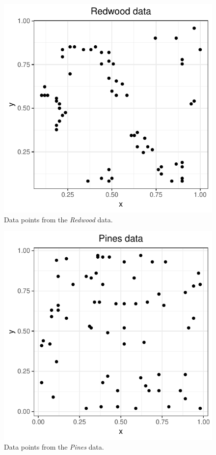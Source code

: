 \begin{figure}
    \centering
    \includegraphics[scale=0.9]{figures/prob1_redwood_points.pdf}
    \caption{Data points from the \textit{Redwood} data.}
    \label{fig:redwood_points}
\end{figure}

\begin{figure}
    \centering
    \includegraphics[scale=0.9]{figures/prob1_pines_points.pdf}
    \caption{Data points from the \textit{Pines} data.}
    \label{fig:pines_points}
\end{figure}

